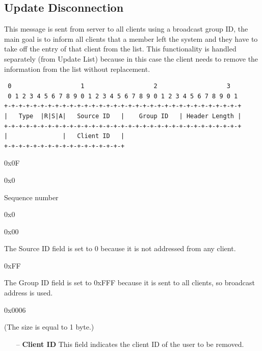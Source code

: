\documentclass{article}
\begin{document}
\subsection{Update Disconnection}
This message is sent from server to all clients using a broadcast group ID, the main goal is to inform all clients that a member left the system and they have to take off the entry of that client from the list. This functionality is handled separately (from Update List) because in this case the client needs to remove the information from the list without replacement.
 
\begin{verbatim}  
 0                   1                   2                   3  
 0 1 2 3 4 5 6 7 8 9 0 1 2 3 4 5 6 7 8 9 0 1 2 3 4 5 6 7 8 9 0 1
+-+-+-+-+-+-+-+-+-+-+-+-+-+-+-+-+-+-+-+-+-+-+-+-+-+-+-+-+-+-+-+-+
|   Type  |R|S|A|   Source ID   |    Group ID   | Header Length |
+-+-+-+-+-+-+-+-+-+-+-+-+-+-+-+-+-+-+-+-+-+-+-+-+-+-+-+-+-+-+-+-+
|               |   Client ID   |
+-+-+-+-+-+-+-+-+-+-+-+-+-+-+-+-+
\end{verbatim}
\begin{description}[align=left]
    \item [Type:] 0x0F
    
    \item [Reserved:] 0x0
        
    \item [Sequence:] Sequence number
    
    \item [Acknowledgement:] 0x0
        
    \item [Source ID:] 0x00
    \begin{flushleft}
        The Source ID field is set to 0 because it is not addressed from any client.
    \end{flushleft}
    
    \item [Group ID:] 0xFF
    \begin{flushleft}
        The Group ID field is set to 0xFFF because it is sent to all clients, so broadcast address is used.
    \end{flushleft}
    
    \item [Header Length:] 0x0006
    
    \item[Options:] (The size is equal to 1 byte.)
    \begin{itemize}
        \item[--]\textbf{Client ID} This field indicates the client ID of the user to be removed.
    \end{itemize}
\end{description}
\end{document}
